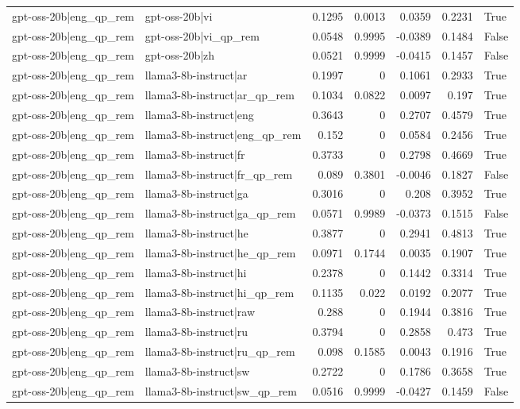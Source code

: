 \begin{table}
\begin{tabular}{l l r r r r l}
gpt-oss-20b|eng_qp_rem & gpt-oss-20b|vi & 0.1295 & 0.0013 & 0.0359 & 0.2231 & True \\
gpt-oss-20b|eng_qp_rem & gpt-oss-20b|vi_qp_rem & 0.0548 & 0.9995 & -0.0389 & 0.1484 & False \\
gpt-oss-20b|eng_qp_rem & gpt-oss-20b|zh & 0.0521 & 0.9999 & -0.0415 & 0.1457 & False \\
gpt-oss-20b|eng_qp_rem & llama3-8b-instruct|ar & 0.1997 & 0 & 0.1061 & 0.2933 & True \\
gpt-oss-20b|eng_qp_rem & llama3-8b-instruct|ar_qp_rem & 0.1034 & 0.0822 & 0.0097 & 0.197 & True \\
gpt-oss-20b|eng_qp_rem & llama3-8b-instruct|eng & 0.3643 & 0 & 0.2707 & 0.4579 & True \\
gpt-oss-20b|eng_qp_rem & llama3-8b-instruct|eng_qp_rem & 0.152 & 0 & 0.0584 & 0.2456 & True \\
gpt-oss-20b|eng_qp_rem & llama3-8b-instruct|fr & 0.3733 & 0 & 0.2798 & 0.4669 & True \\
gpt-oss-20b|eng_qp_rem & llama3-8b-instruct|fr_qp_rem & 0.089 & 0.3801 & -0.0046 & 0.1827 & False \\
gpt-oss-20b|eng_qp_rem & llama3-8b-instruct|ga & 0.3016 & 0 & 0.208 & 0.3952 & True \\
gpt-oss-20b|eng_qp_rem & llama3-8b-instruct|ga_qp_rem & 0.0571 & 0.9989 & -0.0373 & 0.1515 & False \\
gpt-oss-20b|eng_qp_rem & llama3-8b-instruct|he & 0.3877 & 0 & 0.2941 & 0.4813 & True \\
gpt-oss-20b|eng_qp_rem & llama3-8b-instruct|he_qp_rem & 0.0971 & 0.1744 & 0.0035 & 0.1907 & True \\
gpt-oss-20b|eng_qp_rem & llama3-8b-instruct|hi & 0.2378 & 0 & 0.1442 & 0.3314 & True \\
gpt-oss-20b|eng_qp_rem & llama3-8b-instruct|hi_qp_rem & 0.1135 & 0.022 & 0.0192 & 0.2077 & True \\
gpt-oss-20b|eng_qp_rem & llama3-8b-instruct|raw & 0.288 & 0 & 0.1944 & 0.3816 & True \\
gpt-oss-20b|eng_qp_rem & llama3-8b-instruct|ru & 0.3794 & 0 & 0.2858 & 0.473 & True \\
gpt-oss-20b|eng_qp_rem & llama3-8b-instruct|ru_qp_rem & 0.098 & 0.1585 & 0.0043 & 0.1916 & True \\
gpt-oss-20b|eng_qp_rem & llama3-8b-instruct|sw & 0.2722 & 0 & 0.1786 & 0.3658 & True \\
gpt-oss-20b|eng_qp_rem & llama3-8b-instruct|sw_qp_rem & 0.0516 & 0.9999 & -0.0427 & 0.1459 & False \\

\end{tabular}
\end{table}

